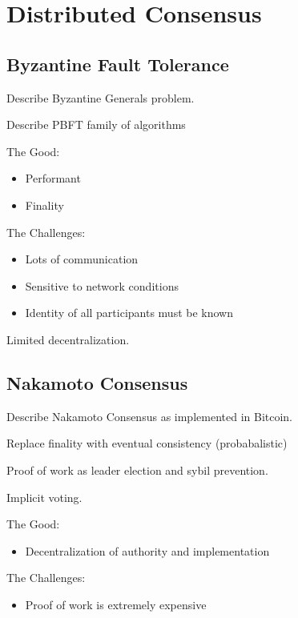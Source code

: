 \section{Distributed Consensus}
\label{sec_priorart}

\subsection{Byzantine Fault Tolerance}

Describe Byzantine Generals problem.

Describe PBFT family of algorithms

The Good:
\begin{itemize}
\item Performant
\item Finality
\end{itemize}

The Challenges:
\begin{itemize}
\item Lots of communication
\item Sensitive to network conditions
\item Identity of all participants must be known
\end{itemize}

Limited decentralization.

\subsection{Nakamoto Consensus}

Describe Nakamoto Consensus as implemented in Bitcoin.

Replace finality with eventual consistency (probabalistic)

Proof of work as leader election and sybil prevention.

Implicit voting.

The Good:
\begin{itemize}
\item Decentralization of authority and implementation
\end{itemize}

The Challenges:
\begin{itemize}
\item Proof of work is extremely expensive
\end{itemize}

